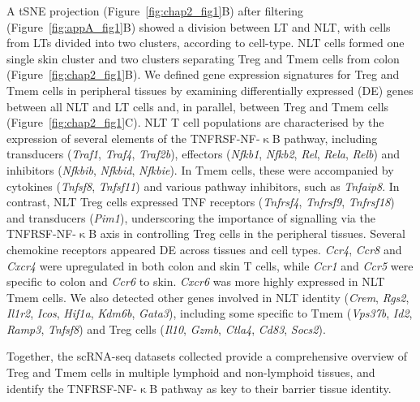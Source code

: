 A tSNE projection (Figure~\ref{fig:chap2_fig1}B) after filtering (Figure~\ref{fig:appA_fig1}B) showed a division between LT and NLT, with cells from LTs divided into two clusters, according to cell-type. NLT cells formed one single skin cluster and two clusters separating Treg and Tmem cells from colon (Figure~\ref{fig:chap2_fig1}B). We defined gene expression signatures for Treg and Tmem cells in peripheral tissues by examining differentially expressed (DE) genes between all NLT and LT cells and, in parallel, between Treg and Tmem cells (Figure~\ref{fig:chap2_fig1}C). NLT T cell populations are characterised by the expression of several elements of the TNFRSF-NF-${\upkappa}$B pathway, including transducers (\textit{Traf1}, \textit{Traf4}, \textit{Traf2b}), effectors (\textit{Nfkb1}, \textit{Nfkb2}, \textit{Rel}, \textit{Rela}, \textit{Relb}) and inhibitors (\textit{Nfkbib}, \textit{Nfkbid}, \textit{Nfkbie}). In Tmem cells, these were accompanied by cytokines (\textit{Tnfsf8}, \textit{Tnfsf11}) and various pathway inhibitors, such as \textit{Tnfaip8}. In contrast, NLT Treg cells expressed TNF receptors (\textit{Tnfrsf4}, \textit{Tnfrsf9}, \textit{Tnfrsf18}) and transducers (\textit{Pim1}), underscoring the importance of signalling via the TNFRSF-NF-${\upkappa}$B axis in controlling Treg cells in the peripheral tissues. Several chemokine receptors appeared DE across tissues and cell types. \textit{Ccr4}, \textit{Ccr8} and \textit{Cxcr4} were upregulated in both colon and skin T cells, while \textit{Ccr1} and \textit{Ccr5} were specific to colon and \textit{Ccr6} to skin. \textit{Cxcr6} was more highly expressed in NLT Tmem cells. We also detected other genes involved in NLT identity (\textit{Crem}, \textit{Rgs2}, \textit{Il1r2}, \textit{Icos}, \textit{Hif1a}, \textit{Kdm6b}, \textit{Gata3}), including some specific to Tmem (\textit{Vps37b}, \textit{Id2}, \textit{Ramp3}, \textit{Tnfsf8}) and Treg cells (\textit{Il10}, \textit{Gzmb}, \textit{Ctla4}, \textit{Cd83}, \textit{Socs2}).

Together, the scRNA-seq datasets collected provide a comprehensive overview of Treg and Tmem cells in multiple lymphoid and non-lymphoid tissues, and identify the TNFRSF-NF-${\upkappa}$B pathway as key to their barrier tissue identity.



